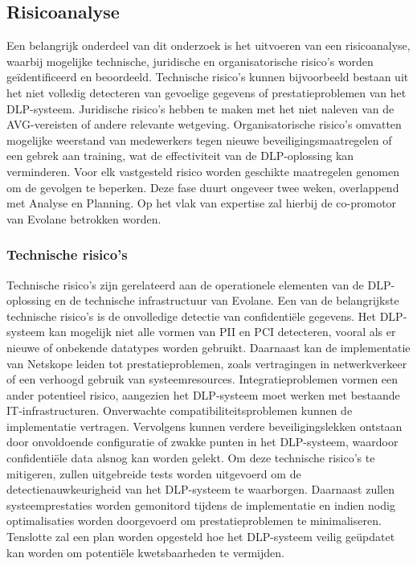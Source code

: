 \subsection{Risicoanalyse}%

Een belangrijk onderdeel van dit onderzoek is het uitvoeren van een risicoanalyse, waarbij mogelijke technische, juridische en organisatorische risico's worden geïdentificeerd en beoordeeld.
Technische risico's kunnen bijvoorbeeld bestaan uit het niet volledig detecteren van gevoelige gegevens of prestatieproblemen van het DLP-systeem. 
Juridische risico's hebben te maken met het niet naleven van de AVG-vereisten of andere relevante wetgeving. 
Organisatorische risico's omvatten mogelijke weerstand van medewerkers tegen nie\-uwe beveiligingsmaatregelen of een gebrek aan training, 
wat de effectiviteit van de DLP-oplossing kan verminderen.
Voor elk vastgesteld risico worden geschikte maatregelen genomen om de gevolgen te beperken.
Deze fase duurt ongeveer twee weken, overlappend met Analyse en Planning. Op het vlak van expertise zal hierbij de co-promotor van Evolane betrokken worden.

\subsubsection{Technische risico's}

Technische risico's zijn gerelateerd aan de operationele elementen van de DLP-oplossing en de technische infrastructuur van Evolane.
Een van de belangrijkste technische risico's is de onvolledige detectie van confidentiële gegevens. 
Het DLP-systeem kan mogelijk niet alle vormen van PII en PCI detecteren, vooral als er nieuwe of onbekende datatypes worden gebruikt.
Daarnaast kan de implementatie van Netskope leiden tot prestatieproblemen, zoals vertragingen in netwerkverkeer of een verhoogd gebruik van systeemresources.
Integratieproblemen vormen een ander potentieel risico, aangezien het DLP-systeem moet werken met bestaande IT-infrastructuren.
Onverwachte compatibiliteitsproblemen kunnen de implementatie vertragen. Vervolgens kunnen verdere beveiligingslekken ontstaan 
door onvoldoende configuratie of zwakke punten in het DLP-systeem, waardoor confidentiële data alsnog kan worden gelekt.
Om deze technische risico's te mitigeren, zullen uitgebreide tests worden uitgevoerd om de detectienauwkeurigheid van het DLP-systeem te waarborgen.
Daarnaast zullen systeemprestaties worden gemonitord tijdens de implementatie en indien nodig optimalisaties worden doorgevoerd om prestatieproblemen te minimaliseren.
Tenslotte zal een plan worden opgesteld hoe het DLP-systeem veilig geüpdatet kan worden om potentiële kwetsbaarheden te vermijden.

